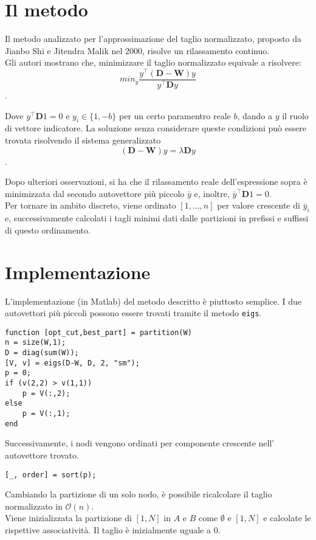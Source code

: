\documentclass{article}
\newcommand{\W}{\mathbf{W}}
\newcommand{\D}{\mathbf{D}}
\begin{document}
\section{Il metodo}
Il metodo analizzato per l'approssimazione del taglio normalizzato, proposto da Jianbo Shi e Jitendra Malik nel 2000, risolve un rilassamento continuo.\\
Gli autori mostrano che, minimizzare il taglio normalizzato equivale a risolvere:
$$ min_y\frac{y^\top (\D-\W)y}{y ^\top \D y}$$.

Dove $y^\top \D 1 = 0$ e $y_i\in\{1, -b\}$ per un certo paramentro reale $b$, dando a $y$ il ruolo di vettore indicatore.
La soluzione senza considerare queste condizioni pu\`o essere trovata risolvendo il sistema generalizzato
$$ (\D - \W)y = \lambda \D y $$.

Dopo ulteriori osservazioni, si ha che il rilassamento reale dell'espressione sopra \`e minimizzata dal secondo autovettore pi\`u piccolo $\bar{y}$ e, inoltre, $\bar{y}^\top \D 1 = 0$. \\
Per tornare in ambito discreto, viene ordinato $[1, \ldots, n]$ per valore crescente di $\bar{y}_i$ e, successivamente calcolati i tagli minimi dati dalle partizioni in prefissi e suffissi di questo ordinamento.

\section{Implementazione}

L'implementazione (in Matlab) del metodo descritto \`e piuttosto semplice.
I due autovettori pi\`u piccoli possono essere trovati tramite il metodo
\texttt{eigs}.

\begin{lstlisting}[style=Matlab-editor]
function [opt_cut,best_part] = partition(W)
n = size(W,1);
D = diag(sum(W));
[V, v] = eigs(D-W, D, 2, "sm");
p = 0;
if (v(2,2) > v(1,1))
    p = V(:,2);
else
    p = V(:,1);
end
\end{lstlisting}

Successivamente, i nodi vengono ordinati per componente crescente nell'
autovettore trovato.

\begin{lstlisting}[style=Matlab-editor]
[_, order] = sort(p);
\end{lstlisting}

Cambiando la partizione di un solo nodo, \`e possibile ricalcolare il taglio normalizzato
in $\mathcal{O}(n)$.\\ Viene inizializzata la partizione di $[1, N]$ in $A$ e $B$ come
$\emptyset$ e $[1, N]$ e calcolate le rispettive associativit\`a. Il taglio \`e inizialmente uguale a $0$.
\end{document}
